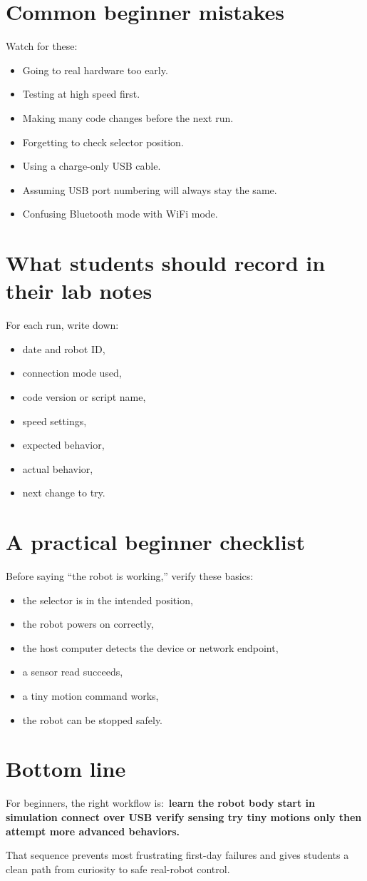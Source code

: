 \documentclass[11pt]{article}
\begin{document}
\section{Common beginner mistakes}
Watch for these:
\begin{itemize}
  \item Going to real hardware too early.
  \item Testing at high speed first.
  \item Making many code changes before the next run.
  \item Forgetting to check selector position.
  \item Using a charge-only USB cable.
  \item Assuming USB port numbering will always stay the same.
  \item Confusing Bluetooth mode with WiFi mode.
\end{itemize}

\section{What students should record in their lab notes}
For each run, write down:
\begin{itemize}
  \item date and robot ID,
  \item connection mode used,
  \item code version or script name,
  \item speed settings,
  \item expected behavior,
  \item actual behavior,
  \item next change to try.
\end{itemize}

\section{A practical beginner checklist}
Before saying ``the robot is working,'' verify these basics:
\begin{itemize}
  \item the selector is in the intended position,
  \item the robot powers on correctly,
  \item the host computer detects the device or network endpoint,
  \item a sensor read succeeds,
  \item a tiny motion command works,
  \item the robot can be stopped safely.
\end{itemize}

\section{Bottom line}
For beginners, the right workflow is:\
\textbf{learn the robot body \textrightarrow{} start in simulation \textrightarrow{} connect over USB \textrightarrow{} verify sensing \textrightarrow{} try tiny motions \textrightarrow{} only then attempt more advanced behaviors.}

That sequence prevents most frustrating first-day failures and gives students a clean path from curiosity to safe real-robot control.
\end{document}

